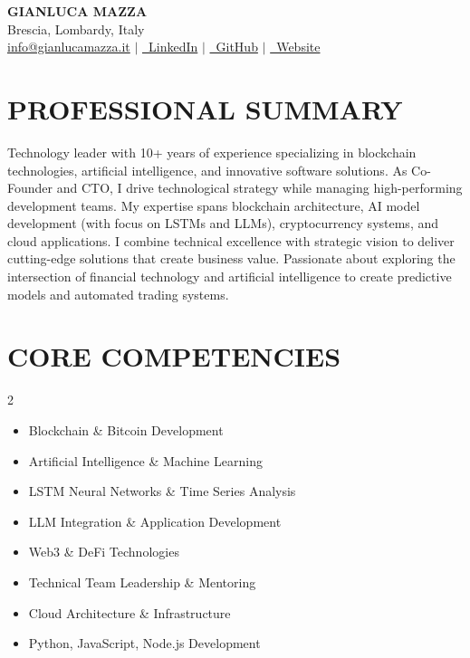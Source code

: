 \documentclass[letterpaper,11pt]{article}
\begin{document}
\begin{center}
    \textbf{\Huge GIANLUCA MAZZA} \\
    \vspace{3pt}
    Brescia, Lombardy, Italy \\
    \vspace{1pt}
    \small \href{mailto:info@gianlucamazza.it}{info@gianlucamazza.it} $|$ 
    \href{https://linkedin.com/in/gianlucamazza}{\faLinkedin\ LinkedIn} $|$
    \href{https://github.com/gianlucamazza}{\faGithub\ GitHub} $|$
    \href{https://gianlucamazza.it}{\faGlobe\ Website}
\end{center}

\section{PROFESSIONAL SUMMARY}
Technology leader with 10+ years of experience specializing in blockchain technologies, artificial intelligence, and innovative software solutions. As Co-Founder and CTO, I drive technological strategy while managing high-performing development teams. My expertise spans blockchain architecture, AI model development (with focus on LSTMs and LLMs), cryptocurrency systems, and cloud applications. I combine technical excellence with strategic vision to deliver cutting-edge solutions that create business value. Passionate about exploring the intersection of financial technology and artificial intelligence to create predictive models and automated trading systems.

\section{CORE COMPETENCIES}
\begin{multicols}{2}
\begin{itemize}[leftmargin=*]
    \item Blockchain \& Bitcoin Development
    \item Artificial Intelligence \& Machine Learning
    \item LSTM Neural Networks \& Time Series Analysis
    \item LLM Integration \& Application Development
    \item Web3 \& DeFi Technologies
    \item Technical Team Leadership \& Mentoring
    \item Cloud Architecture \& Infrastructure
    \item Python, JavaScript, Node.js Development
\end{itemize}
\end{multicols}
\end{document}
